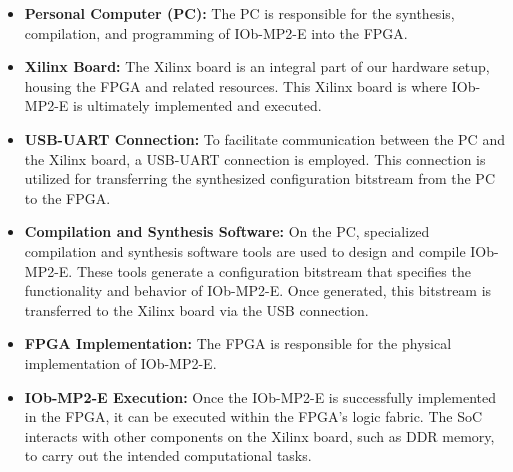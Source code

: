 \begin{itemize}
    \item \textbf{Personal Computer (PC):} The PC is responsible for the synthesis, compilation, and programming of IOb-MP2-E into the FPGA.
    \item \textbf{Xilinx Board:} The Xilinx board is an integral part of our hardware setup, housing the FPGA and related resources. This Xilinx board is where IOb-MP2-E is ultimately implemented and executed.
    \item \textbf{USB-UART Connection:} To facilitate communication between the PC and the Xilinx board, a USB-UART connection is employed. This connection is utilized for transferring the synthesized configuration bitstream from the PC to the FPGA.
    \item \textbf{Compilation and Synthesis Software:} On the PC, specialized compilation and synthesis software tools are used to design and compile IOb-MP2-E. These tools generate a configuration bitstream that specifies the functionality and behavior of IOb-MP2-E. Once generated, this bitstream is transferred to the Xilinx board via the USB connection.
    \item \textbf{FPGA Implementation:} The FPGA is responsible for the physical implementation of IOb-MP2-E.
    \item \textbf{IOb-MP2-E Execution:} Once the IOb-MP2-E is successfully implemented in the FPGA, it can be executed within the FPGA's logic fabric. The SoC interacts with other components on the Xilinx board, such as DDR memory, to carry out the intended computational tasks.
\end{itemize}

